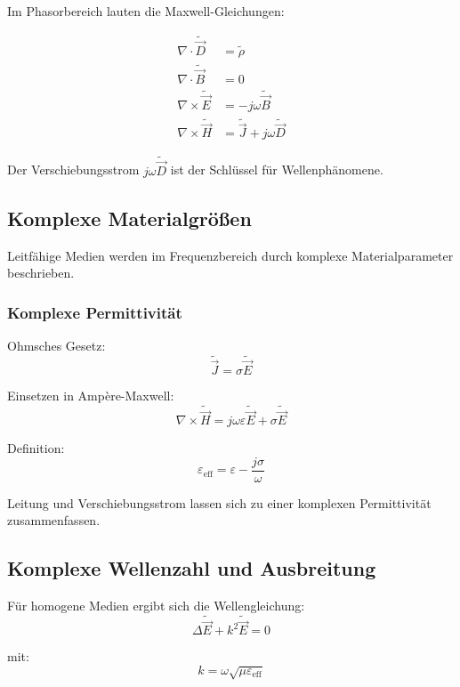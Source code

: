 \documentclass[a4paper]{article}
\newcommand{\E}{\vec E}
\newcommand{\D}{\vec D}
\newcommand{\Hf}{\vec H}
\newcommand{\B}{\vec B}
\newcommand{\J}{\vec J}
\newcommand{\eps}{\varepsilon}
\begin{document}
Im Phasorbereich lauten die Maxwell-Gleichungen:

\begin{align}
\nabla \cdot \tilde{\D} &= \tilde{\rho} \\
\nabla \cdot \tilde{\B} &= 0 \\
\nabla \times \tilde{\E} &= -j\omega \tilde{\B} \\
\nabla \times \tilde{\Hf} &= \tilde{\J} + j\omega \tilde{\D}
\end{align}

\begin{merke}
Der Verschiebungsstrom $j\omega\tilde{\D}$ ist der Schlüssel für Wellenphänomene.
\end{merke}

\subsection{Komplexe Materialgrößen}

Leitfähige Medien werden im Frequenzbereich durch komplexe Materialparameter beschrieben.

\subsubsection{Komplexe Permittivität}

Ohmsches Gesetz:
\[
\tilde{\J}=\sigma\tilde{\E}
\]

Einsetzen in Amp\`ere-Maxwell:
\[
\nabla \times \tilde{\Hf} = j\omega\eps\tilde{\E} + \sigma\tilde{\E}
\]

Definition:
\[
\eps_\text{eff} = \eps - \frac{j\sigma}{\omega}
\]

\begin{merke}
Leitung und Verschiebungsstrom lassen sich zu einer komplexen Permittivität zusammenfassen.
\end{merke}

\subsection{Komplexe Wellenzahl und Ausbreitung}

Für homogene Medien ergibt sich die Wellengleichung:
\[
\Delta \tilde{\E} + k^2 \tilde{\E} = 0
\]

mit:
\[
k = \omega\sqrt{\mu\eps_\text{eff}}
\]
\end{document}
